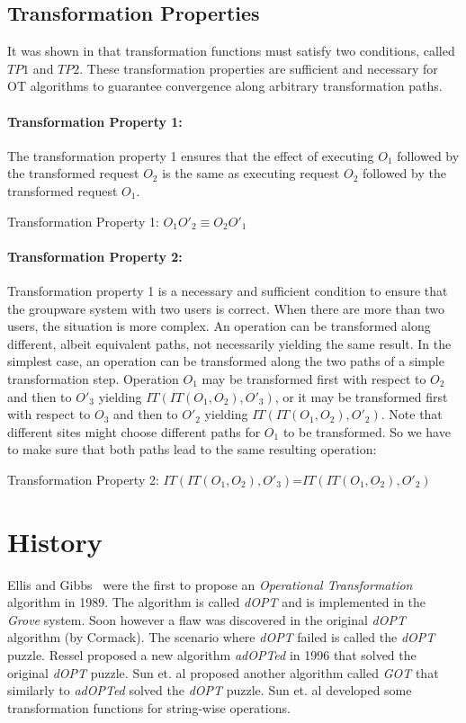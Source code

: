 \documentclass[11pt,a4paper]{article}
\begin{document}
\subsection{Transformation Properties}
It was shown in \cite{ressel96} that transformation functions must satisfy two conditions, called $TP1$ and $TP2$. These transformation properties are sufficient and necessary for OT algorithms to guarantee convergence along arbitrary transformation paths.

\paragraph{Transformation Property 1:}
The transformation property 1 ensures that the effect of executing $O_{1}$ followed by the transformed request $O_{2}$ is the same as executing request $O_{2}$ followed by the transformed request $O_{1}$. 

\begin{defn}
Transformation Property 1:
$ O_{1} O'_{2} \equiv O_{2} O'_{1} $
\end{defn}

\paragraph{Transformation Property 2:}
Transformation property 1 is a necessary and sufficient condition to ensure that the groupware system with two users is correct. When there are more than two users, the situation is more complex. An operation can be transformed along different, albeit equivalent paths, not necessarily yielding the same result. In the simplest case, an operation can be transformed along the two paths of a simple transformation step. Operation $O_{1}$ may be transformed first with respect to $O_{2}$ and then to $O'_{3}$ yielding $IT(IT(O_{1},O_{2}),O'_{3})$, or it may be transformed first with respect to $O_{3}$ and then to $O'_{2}$ yielding $IT(IT(O_{1},O_{2}),O'_{2})$. Note that different sites might choose different paths for $O_{1}$ to be transformed. So we have to make sure that both paths lead to the same resulting operation:

\begin{defn}
Transformation Property 2: 
$IT(IT(O_{1},O_{2}),O'_{3})$=$IT(IT(O_{1},O_{2}),O'_{2})$
\end{defn}


\section{History}
{Ellis and Gibbs}~\cite{ellis} were the first to propose an \emph{Operational Transformation} algorithm in 1989. The algorithm is called \emph{dOPT} and is implemented in the \emph{Grove} system. Soon however a flaw was discovered in the original \emph{dOPT} algorithm (by Cormack\cite{cormack95a}). The scenario where \emph{dOPT} failed is called the \emph{dOPT} puzzle. Ressel\cite{ressel96} proposed a new algorithm \emph{adOPTed} in 1996 that solved the original \emph{dOPT} puzzle. {Sun et. al}\cite{sun98a} proposed another algorithm called \emph{GOT} that similarly to \emph{adOPTed} solved the \emph{dOPT} puzzle. {Sun et. al}\cite{sun98b} developed some transformation functions for string-wise operations.
\end{document}
